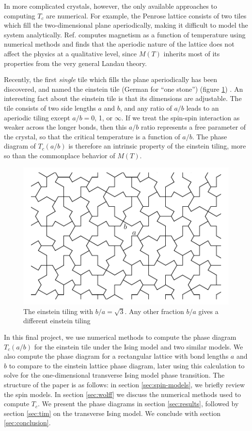 \documentclass[
  amsmath,
  amssymb,
  aps,
  twocolumn,
  nofootinbib,
  floatfix,
]{revtex4-2}
\begin{document}
In more complicated crystals, however, the only available approaches to computing $T_c$ are numerical. For example, the Penrose lattice consists of two tiles which fill the two-dimensional plane aperiodically, making it difficult to model the system analytically. Ref. \cite{penrose-ising} computes magnetism as a function of temperature using numerical methods and finds that the aperiodic nature of the lattice does not affect the physics at a qualitative level, since $M(T)$ inherits most of its properties from the very general Landau theory.

Recently, the first \textit{single} tile which fills the plane aperiodically has been discovered, and named the einstein tile (German for ``one stone'') (figure \ref{fig:einstein}) \cite{smith2023aperiodic}. An interesting fact about the einstein tile is that its dimensions are adjustable. The tile consists of two side lengths $a$ and $b$, and any ratio of $a/b$ leads to an aperiodic tiling except $a/b=0$, 1, or $\infty$. If we treat the spin-spin interaction as weaker across the longer bonds, then this $a/b$ ratio represents a free parameter of the crystal, so that the critical temperature is a function of $a/b$. The phase diagram of $T_c(a/b)$ is therefore an intrinsic property of the einstein tiling, more so than the commonplace behavior of $M(T)$.

\begin{figure}
  \centering
  \includegraphics[width=\linewidth]{../figs/einstein.pdf}
  \caption{The einstein tiling with $b/a=\sqrt{3}$. Any other fraction $b/a$ gives a different einstein tiling}
  \label{fig:einstein}
\end{figure}

In this final project, we use numerical methods to compute the phase diagram $T_c(a/b)$ for the einstein tile under the Ising model and two similar models. We also compute the phase diagram for a rectangular lattice with bond lengths $a$ and $b$ to compare to the einstein lattice phase diagram, later using this calculation to solve for the one-dimensional transverse Ising model phase transition. The structure of the paper is as follows: in section \ref{sec:spin-models}, we briefly review the spin models. In section \ref{sec:wolff} we discuss the numerical methods used to compute $T_c$. We present the phase diagrams in section \ref{sec:results}, followed by section \ref{sec:tim} on the transverse Ising model. We conclude with section \ref{sec:conclusion}.
\end{document}
